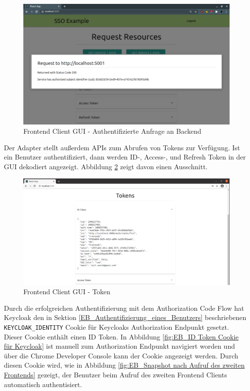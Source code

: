 \begin{figure}[!ht]
	\centering
	\includegraphics[width=1\textwidth]{Images/EbertScherer/FrontendLoggedInBackendRequest.PNG}
	\caption{Frontend Client GUI - Authentifizierte Anfrage an Backend}
	\label{fig:EB_Authentifizierte Anfrage an Backend}
\end{figure} 

Der Adapter stellt außerdem APIs zum Abrufen von Tokens zur Verfügung. Ist ein Benutzer authentifiziert, dann werden ID-, Access-, und Refresh Token in der GUI dekodiert angezeigt. Abbildung \ref{fig:EB_Token} zeigt davon einen Ausschnitt.

\begin{figure}[!ht]
	\centering
	\includegraphics[width=1\textwidth]{Images/EbertScherer/FrontendIDTokenExample.PNG}
	\caption{Frontend Client GUI - Token}
	\label{fig:EB_Token}
\end{figure}

Durch die erfolgreichen Authentifizierung mit dem Authorization Code Flow hat Keycloak den in Sektion \ref{EB_Authentifizierung_eines_Benutzers} beschriebenen \texttt{KEYCLOAK\_IDENTITY} Cookie für Keycloaks Authorization Endpunkt gesetzt. Dieser Cookie enthält einen ID Token. In Abbildung \ref{fig:EB_ID Token Cookie für Keycloak} ist manuell zum Authorization Endpunkt navigiert worden und über die Chrome Developer Console kann der Cookie angezeigt werden. Durch diesen Cookie wird, wie in Abbildung \ref{fig:EB_Snapshot nach Aufruf des zweiten Frontends} gezeigt, der Benutzer beim Aufruf des zweiten Frontend Clients automatisch authentisiert.


